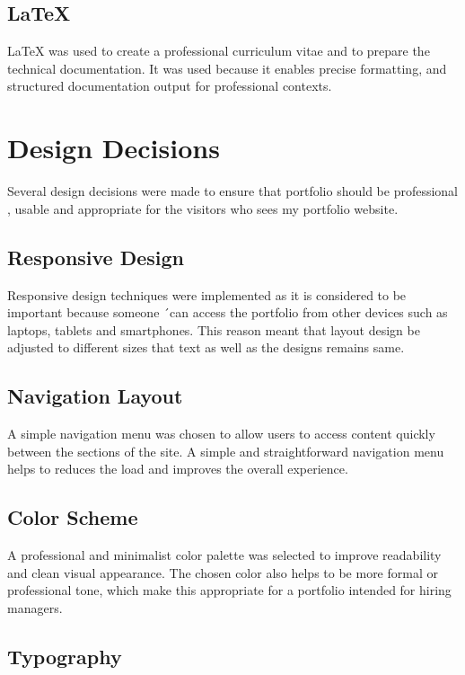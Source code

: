 \documentclass[12pt,a4paper]{article}
\begin{document}
\subsection{LaTeX}

LaTeX was used to create a professional curriculum vitae and to prepare the technical documentation. It was used because it enables precise formatting, and structured documentation output for professional contexts.
\section{Design Decisions}

Several design decisions were made to ensure that portfolio should be professional , usable and appropriate for the visitors who sees my portfolio website.

\subsection{Responsive Design}

Responsive design techniques were implemented as it is considered to be important because someone ´can access the portfolio from other devices such as laptops, tablets and smartphones. This reason meant that layout design be adjusted to different sizes that text as well as the designs remains same.

\subsection{Navigation Layout}

A simple navigation menu was chosen to allow users to access content quickly between the sections of the site. A simple and straightforward navigation menu helps to reduces the load and improves the overall experience. 

\subsection{Color Scheme}

A professional and minimalist color palette was selected to improve readability and clean visual appearance. The chosen color also helps to be more formal or professional tone, which make this appropriate for a portfolio intended for hiring managers. 

\subsection{Typography }
\end{document}
